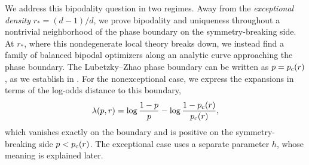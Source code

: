 We address this bipodality question in two regimes.  Away from the \emph{exceptional density}
$r_*=(d-1)/d$, we prove bipodality and uniqueness throughout a nontrivial
neighborhood of the phase boundary on the symmetry-breaking side.  At $r_*$,
where this nondegenerate local theory breaks down, we instead find a family of
balanced bipodal optimizers along an analytic curve approaching the phase boundary.
The Lubetzky--Zhao phase boundary can be written as $p=p_{\mathrm c}(r)$,
as we establish in .
For the nonexceptional case, we express the expansions
in terms of the log-odds distance to this boundary,
\[
  \lambda(p, r) = \log \frac{1-p}{p} - \log \frac{1-p_{\mathrm c}(r)}{p_{\mathrm c}(r)},
\]
which vanishes exactly on the boundary and is positive on the symmetry-breaking side $p<p_{\mathrm c}(r)$.
The exceptional case uses a separate parameter $h$, whose meaning is explained later.
